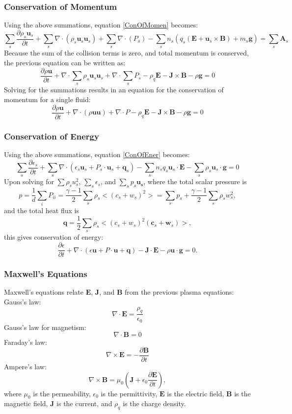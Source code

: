 \subsubsection{Conservation of Momentum}
Using the above summations, equation \ref{ConOfMomen} becomes:
$$ \sum_s \frac{\partial \rho_s \mathbf{u}_s}{\partial t} + \sum_s \nabla \cdot
(\rho_s \mathbf{u}_s \mathbf{u}_s) + \sum_s \nabla \cdot (P_s) - \sum_s
n_s(q_s(\mathbf{E} + \mathbf{u}_s \times \mathbf{B}) + m_s\mathbf{g}) = \sum_s
\mathbf{A}_s $$
Because the sum of the collision terms is zero, and total momentum is
conserved, the previous equation can be written as:
$$\frac{\partial \rho \mathbf{u}}{\partial t} + \nabla \cdot \sum_s \rho_s
\mathbf{u}_s \mathbf{u}_s + \nabla \cdot \sum_s P_s - \rho_q\mathbf{E} -
\mathbf{J} \times \mathbf{B} - \rho \mathbf{g} = 0 $$
Solving for the summations results in an equation for the conservation of
momentum for a single fluid:
\begin{equation}
\frac{\partial \rho \mathbf{u}}{\partial t} + \nabla \cdot (\rho
\mathbf{u u}) + \nabla \cdot P - \rho_q\mathbf{E} - \mathbf{J}
\times \mathbf{B} - \rho \mathbf{g} = 0
\label{FluidConOfMomen}
\end{equation}
\subsubsection{Conservation of Energy}
Using the above summations, equation \ref{ConOfEner} becomes:
$$ \sum_s \frac{\partial \epsilon_s}{\partial t} + \sum_s \nabla \cdot
(\epsilon_s \mathbf{u}_s + P_s \cdot \mathbf{u}_s + \mathbf{q}_s) - \sum_s n_s
q_s \mathbf{u}_s \cdot \mathbf{E} - \sum_s \rho_s \mathbf{u}_s \cdot \mathbf{g}
= 0 $$
Upon solving for $ \sum \rho_s u_s^2 $, $\sum_s \epsilon_s $, and $\sum_s p_s
\mathbf{u_s} $, where the total scalar pressure is
$$p = \frac{1}{d} \sum_i P_{ii} = \frac{\gamma - 1}{2} \sum_s \rho_s < ( c_s
+ w_s)^2 > = \sum_s p_s + \frac{\gamma -1}{2} \sum_s \rho_s w_s^2,$$
and the total heat flux is
$$ \mathbf{q} = \frac{1}{2} \sum_s \rho_s < (c_s + w_s)^2(\mathbf{c}_s +
\mathbf{w}_s) > ,$$
this gives conservation of energy:
\begin{equation}
\frac{\partial \epsilon}{\partial t} + \nabla \cdot (\epsilon \mathbf{u} + P
\cdot \mathbf{u} + \mathbf{q}) - \mathbf{J} \cdot \mathbf{E} - \rho\mathbf{u}
\cdot \mathbf{g} = 0.
\label{FluidConOfEner}
\end{equation}
\subsubsection{Maxwell's Equations}
Maxwell's equations relate $\mathbf{E}$, $\mathbf{J}$, and $\mathbf{B}$ from the
previous plasma equations:
\\Gauss's law:$$ \nabla \cdot \mathbf{E} = \frac{\rho_q}{\epsilon_0}$$
Gauss's law for magnetism: $$ \nabla \cdot \mathbf{B} = 0 $$
Faraday's law:$$ \nabla \times \mathbf{E} = - \frac{\partial
\mathbf{B}}{\partial t} $$ 
Ampere's law:$$ \nabla \times \mathbf{B} = \mu_0(\mathbf{J} + \epsilon_0
\frac{\partial \mathbf{E}}{\partial t}) ,$$
where $\mu_0$ is the permeability, $\epsilon_0$ is the permittivity,
$\mathbf{E}$ is the electric field, $\mathbf{B}$ is the magnetic field,
$\mathbf{J}$ is the current, and $\rho_q$ is the charge density.
